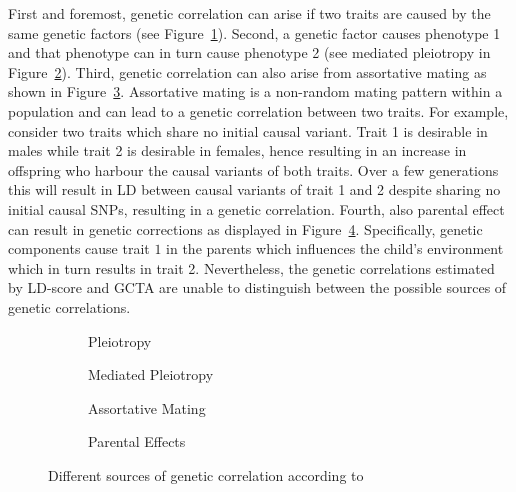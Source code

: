 First and foremost, genetic correlation can arise if two traits are caused by the same genetic factors (see Figure~\ref{fig:pleiotropy}).
Second, a genetic factor  causes phenotype 1 and that phenotype can in turn cause phenotype 2 (see mediated pleiotropy in Figure~\ref{fig:mediated_pleiotropy}).
Third, genetic correlation can also arise from assortative mating as shown in Figure~\ref{fig:assortative_mating}.
Assortative mating is a non-random mating pattern within a population and can lead to a genetic correlation between two traits.
For example, consider two traits which share no initial causal variant.
Trait 1 is desirable in males while trait 2 is desirable in females, hence resulting in an increase in offspring who harbour the causal variants of both traits.
Over a few generations this will result in LD between causal variants of trait 1 and 2 despite sharing no initial causal SNPs, resulting in a genetic correlation. 
Fourth, also parental effect can result in genetic corrections as displayed in Figure~\ref{fig:parental_effects}.
Specifically, genetic components cause trait $1$ in the parents which influences the child's environment which in turn results in trait 2. 
Nevertheless, the genetic correlations estimated by LD-score and GCTA are unable to distinguish between the possible sources of genetic correlations.

\begin{figure}[htp]
  \begin{subfigure}[t]{0.4\textwidth}
    \centering
    \resizebox{0.5\linewidth}{!}{} 
    \caption{Pleiotropy}\label{fig:pleiotropy}
  \end{subfigure}
  \begin{subfigure}[t]{0.4\textwidth}
    \centering
    \resizebox{0.5\linewidth}{!}{} 
    \caption{Mediated Pleiotropy}\label{fig:mediated_pleiotropy}
  \end{subfigure}
  \begin{subfigure}[t]{0.4\textwidth}
    \centering
    \resizebox{0.6\linewidth}{!}{} 
    \caption{Assortative Mating}\label{fig:assortative_mating}
  \end{subfigure}
  \begin{subfigure}[t]{0.4\textwidth}
    \centering
    \resizebox{0.6\linewidth}{!}{}
    \caption{Parental Effects}\label{fig:parental_effects}
  \end{subfigure}
  \caption[Sources of Genetic Correlations]{Different sources of genetic correlation according to~\citet{Pickrell2016}}\label{fig:genetic_correlation}
\end{figure}

